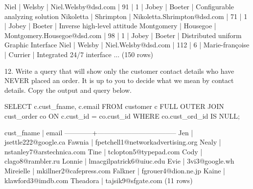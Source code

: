 \begin{pseudo*}
 Niel        | Welsby      | Niel.Welsby@dsd.com         |          91 |       1 | Jobey           | Boeter           | Configurable analyzing solution
 Nikoletta   | Shrimpton   | Nikoletta.Shrimpton@dsd.com |          71 |       1 | Jobey           | Boeter           | Inverse high-level attitude
 Montgomery  | Housegoe    | Montgomery.Housegoe@dsd.com |          98 |       1 | Jobey           | Boeter           | Distributed uniform Graphic Interface
 Niel        | Welsby      | Niel.Welsby@dsd.com         |         112 |       6 | Marie-françoise | Currier          | Integrated 24/7 interface
...
(150 rows)
\end{pseudo*}

12. Write a query that will show only the customer contact details who have NEVER placed an order. It is up to you to decide what we mean by contact details. Copy the output and query below.
\begin{sql}
SELECT c.cust_fname, c.email FROM customer c
FULL OUTER JOIN cust_order co ON c.cust_id = co.cust_id
WHERE co.cust_ord_id IS NULL;
\end{sql}
\begin{pseudo*}
 cust_fname |               email
------------+-----------------------------------
 Jen        | jsettle222@google.ca
 Fawnia     | fpetchell1@networkadvertising.org
 Nealy      | nstanley7@arstechnica.com
 Tine       | tclopton5@typepad.com
 Cody       | clago8@rambler.ru
 Lonnie     | lmacgilpatrick6@uiuc.edu
 Evie       | 3vi3@google.wh
 Mireielle  | mkillner2@cafepress.com
 Falkner    | fgrouer4@dion.ne.jp
 Kaine      | klawford3@imdb.com
 Theadora   | tajsik9@sfgate.com
(11 rows)
\end{pseudo*}